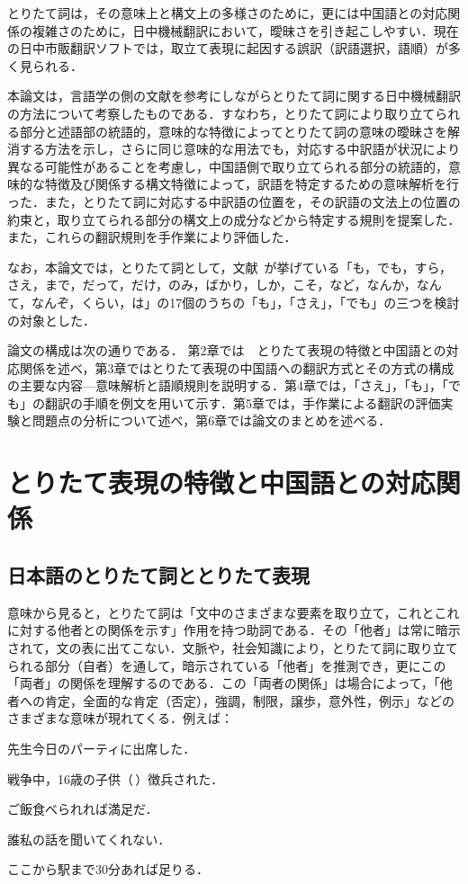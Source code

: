 とりたて詞は，その意味上と構文上の多様さのために，更には中国語との対応関係の複雑さのために，日中機械翻訳において，曖昧さを引き起こしやすい．現在の日中市販翻訳ソフトでは，取立て表現に起因する誤訳（訳語選択，語順）が多く見られる．

本論文は，言語学の側の文献を参考にしながらとりたて詞に関する日中機械翻訳の方法について考察したものである．すなわち，とりたて詞により取り立てられる部分と述語部の統語的，意味的な特徴によってとりたて詞の意味の曖昧さを解消する方法を示し，さらに同じ意味的な用法でも，対応する中訳語が状況により異なる可能性があることを考慮し，中国語側で取り立てられる部分の統語的，意味的な特徴及び関係する構文特徴によって，訳語を特定するための意味解析を行った．また，とりたて詞に対応する中訳語の位置を，その訳語の文法上の位置の約束と，取り立てられる部分の構文上の成分などから特定する規則を提案した．また，これらの翻訳規則を手作業により評価した．

なお，本論文では，とりたて詞として，文献~\cite{kinsui00}が挙げている「も，でも，すら，さえ，まで，だって，だけ，のみ，ばかり，しか，こそ，など，なんか，なんて，なんぞ，くらい，は」の17個のうちの「も」，「さえ」，「でも」の三つを検討の対象とした．

論文の構成は次の通りである．
第2章では　とりたて表現の特徴と中国語との対応関係を述べ，第3章ではとりたて表現の中国語への翻訳方式とその方式の構成の主要な内容---意味解析と語順規則を説明する．第4章では，「さえ」，「も」，「でも」の翻訳の手順を例文を用いて示す．第5章では，手作業による翻訳の評価実験と問題点の分析について述べ，第6章では論文のまとめを述べる．


\section{とりたて表現の特徴と中国語との対応関係}
\subsection{日本語のとりたて詞ととりたて表現}
意味から見ると，とりたて詞は「文中のさまざまな要素を取り立て，これとこれに対する他者との関係を示す」作用を持つ助詞である．その「他者」は常に暗示されて，文の表に出てこない．文脈や，社会知識により，とりたて詞に取り立てられる部分（自者）を通して，暗示されている「他者」を推測でき，更にこの「両者」の関係を理解するのである．この「両者の関係」は場合によって，「他者への肯定，全面的な肯定（否定），強調，制限，譲歩，意外性，例示」などのさまざまな意味が現れてくる．例えば：

\begin{enumerates}
 \item 先生今日のパーティに出席した．
 \item 戦争中，16歳の子供（\,）徴兵された．
 \item ご飯食べられれば満足だ．
 \item 誰私の話を聞いてくれない．
 \item ここから駅まで30分あれば足りる．
\end{enumerates}

